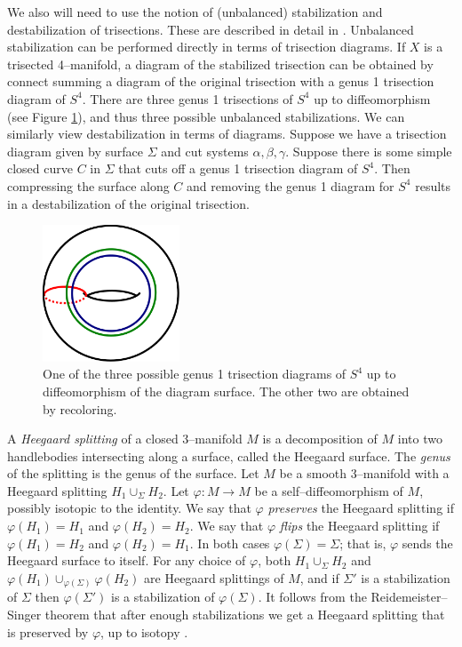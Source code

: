 \documentclass[12pt]{amsart}
\theoremstyle{definition}
\theoremstyle{remark}
\begin{document}
We also will need to use the notion of (unbalanced) stabilization and destabilization of trisections.
These are described in detail in \cite{MeierSchirmerZupan1}.
Unbalanced stabilization can be performed directly in terms of trisection diagrams.
If $X$ is a trisected 4--manifold, a diagram of the stabilized trisection can be obtained by connect summing a diagram of the original trisection with a genus 1 trisection diagram of $S^4$.
There are three genus 1 trisections of $S^4$ up to diffeomorphism (see Figure \ref{s3g1}), and thus three possible unbalanced stabilizations.
We can similarly view destabilization in terms of diagrams.
Suppose we have a trisection diagram given by surface $\Sigma$ and cut systems $\alpha,\beta,\gamma$.
Suppose there is some simple closed curve $C$ in $\Sigma$ that cuts off a genus 1 trisection diagram of $S^4$.
Then compressing the surface along $C$ and removing the genus 1 diagram for $S^4$ results in a destabilization of the original trisection.


\begin{figure}[h]
\centering
\includegraphics[height=1.6in]{S4trisection_genus1.png}
\caption{One of the three possible genus 1 trisection diagrams of $S^4$ up to diffeomorphism of the diagram surface.
The other two are obtained by recoloring.}
\label{s3g1}
\end{figure}

A \emph{Heegaard splitting} of a closed 3--manifold $M$ is a decomposition of $M$ into two handlebodies intersecting along a surface, called the Heegaard surface.
The \emph{genus} of the splitting is the genus of the surface.
Let $M$ be a smooth 3--manifold with a Heegaard splitting $H_1 \cup_\Sigma H_2$.
Let $\varphi \colon M \to M$ be a self--diffeomorphism of $M$, possibly isotopic to the identity.
We say that $\varphi$ \emph{preserves} the Heegaard splitting if $\varphi(H_1) = H_1$ and $\varphi(H_2)=H_2$.
We say that $\varphi$ \emph{flips} the Heegaard splitting if $\varphi(H_1) = H_2$ and $\varphi(H_2)=H_1$.
In both cases $\varphi(\Sigma) = \Sigma$; that is, $\varphi$ sends the Heegaard surface to itself.
For any choice of $\varphi$, both $H_1 \cup_\Sigma H_2$ and $\varphi(H_1) \cup_{\varphi(\Sigma)} \varphi(H_2)$ are Heegaard splittings of $M$, and if $\Sigma'$ is a stabilization of $\Sigma$ then $\varphi(\Sigma')$ is a stabilization of $\varphi(\Sigma)$.
It follows from the Reidemeister--Singer theorem that after enough stabilizations we get a Heegaard splitting that is preserved by $\varphi$, up to isotopy \cite{Reidemeister1}\cite{Singer1}.
\end{document}
